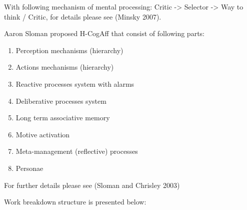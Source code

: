 With following mechanism of mental processing: Critic -\textgreater{}
Selector -\textgreater{} Way to think / Critic, for details please see
(Minsky 2007).

Aaron Sloman proposed H-CogAff that consist of following parts:

\begin{enumerate}
\def\labelenumi{\arabic{enumi}.}
\item
  Perception mechanisms (hierarchy)
\item
  Actions mechanisms (hierarchy)
\item
  Reactive processes system with alarms
\item
  Deliberative processes system
\item
  Long term associative memory
\item
  Motive activation
\item
  Meta-management (reflective) processes
\item
  Personae
\end{enumerate}

For further details please see (Sloman and Chrisley 2003)

Work breakdown structure is presented below:

